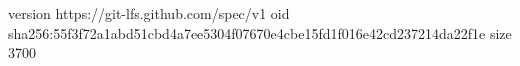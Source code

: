 version https://git-lfs.github.com/spec/v1
oid sha256:55f3f72a1abd51cbd4a7ee5304f07670e4cbe15fd1f016e42cd237214da22f1e
size 3700
